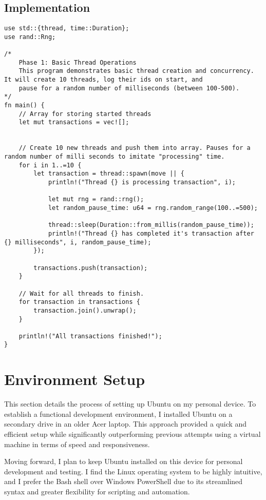 \documentclass{report}
\begin{document}
\section{Implementation}
\begin{lstlisting}[caption={Basic Thread Operations in Rust}, label=code:phase1]
use std::{thread, time::Duration};
use rand::Rng;

/*
    Phase 1: Basic Thread Operations
    This program demonstrates basic thread creation and concurrency. It will create 10 threads, log their ids on start, and
    pause for a random number of milliseconds (between 100-500).
*/
fn main() {
    // Array for storing started threads
    let mut transactions = vec![];
    

    // Create 10 new threads and push them into array. Pauses for a random number of milli seconds to imitate "processing" time.
    for i in 1..=10 {
        let transaction = thread::spawn(move || {
            println!("Thread {} is processing transaction", i);

            let mut rng = rand::rng();
            let random_pause_time: u64 = rng.random_range(100..=500);

            thread::sleep(Duration::from_millis(random_pause_time));
            println!("Thread {} has completed it's transaction after {} milliseconds", i, random_pause_time);
        });
        
        transactions.push(transaction);
    }

    // Wait for all threads to finish.
    for transaction in transactions {
        transaction.join().unwrap();
    }

    println!("All transactions finished!");
}
\end{lstlisting}
\chapter{Environment Setup}
This section details the process of setting up Ubuntu on my personal device. To establish a functional development environment, I installed Ubuntu on a secondary drive in an older Acer laptop. This approach provided a quick and efficient setup while significantly outperforming previous attempts using a virtual machine in terms of speed and responsiveness.  

Moving forward, I plan to keep Ubuntu installed on this device for personal development and testing. I find the Linux operating system to be highly intuitive, and I prefer the Bash shell over Windows PowerShell due to its streamlined syntax and greater flexibility for scripting and automation.
\end{document}
